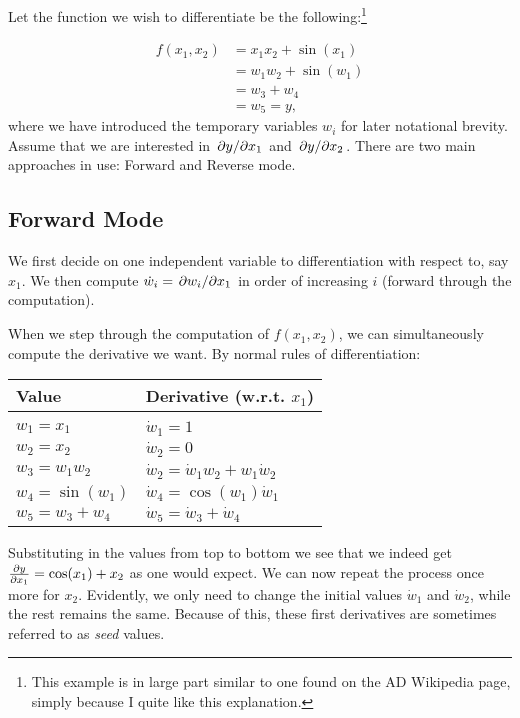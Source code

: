\documentclass[Thesis.tex]{subfiles}
\begin{document}
Let the function we wish to differentiate be the following:\footnote{This example is in large part similar to one found
    on the AD Wikipedia page, simply because I quite like this explanation.}

\begin{align}
  f(x_1, x_2) &= x_1x_2 + \sin(x_1)\\
              &= w_1w_2 + \sin(w_1)\\
              &= w_3 + w_4\\
              &= w_5 = y,
\end{align}
where we have introduced the temporary variables $w_i$ for later notational brevity.
Assume that we are interested in $\pdv*{y}{x_1}$ and $\pdv*{y}{x_2}$. There are
two main approaches in use: Forward and Reverse mode.

\subsection{Forward Mode}

We first decide on one independent variable to differentiation with respect to,
say $x_1$. We then compute $\dot w_i = \pdv*{w_i}{x_1}$ in order of increasing
$i$ (forward through the computation).

When we step through the computation of $f(x_1, x_2)$, we can simultaneously
compute the derivative we want. By normal rules of differentiation:

\begin{center}
  \begin{tabular}{ll}
    Value & Derivative (w.r.t. $x_1$)\\\hline\\
    $w_1 = x_1$ & $\dot w_1 = 1$\\
    $w_2 = x_2$ & $\dot w_2 = 0$\\
    $w_3 = w_1w_2$ & $\dot w_2 = \dot w_1 w_2 + w_1\dot w_2$\\
    $w_4 = \sin(w_1)$ & $\dot w_4 = \cos(w_1)\dot w_1$\\
    $w_5 = w_3 + w_4$ & $\dot w_5 = \dot w_3 +\dot w_4$\\
  \end{tabular}
\end{center}
Substituting in the values from top to bottom we see that we indeed get
$\pdv{y}{x_1}=\cos(x_1)+x_2$ as one would expect. We can now repeat the process
once more for $x_2$. Evidently, we only need to change the initial values $\dot
w_1$ and $\dot w_2$, while the rest remains the same. Because of this, these
 first derivatives are sometimes referred to as \emph{seed} values.
\end{document}
